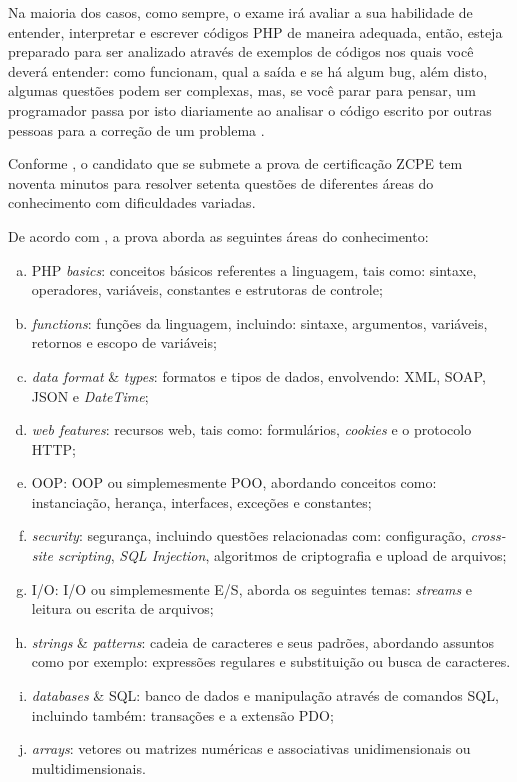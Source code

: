 Na maioria dos casos, como sempre, o exame irá avaliar a sua habilidade de
entender, interpretar e escrever códigos \acs{PHP} de maneira adequada, então,
esteja preparado para ser analizado através de exemplos de códigos nos quais
você deverá entender: como funcionam, qual a saída e se há algum \acs{bug},
além disto, algumas questões podem ser complexas, mas, se você parar para
pensar, um programador passa por isto diariamente ao analisar o código escrito
por outras pessoas para a correção de um problema
\cite{theZendPHPCertificationPracticeTestBook}.

Conforme , o candidato que
se submete a prova de certificação \acs{ZCPE} tem noventa minutos para resolver 
setenta questões de diferentes áreas do conhecimento com dificuldades variadas.

De acordo com , a prova aborda as seguintes áreas do
conhecimento:

\begin{enumerate}[a)]
    \item \acs{PHP} \textit{basics}: conceitos básicos referentes a
    linguagem, tais como: sintaxe, operadores, variáveis, constantes e
    estrutoras de controle;
    \item \textit{functions}: funções da linguagem, incluindo: sintaxe,
    argumentos, variáveis, retornos e escopo de variáveis;
    \item \textit{data format} \& \textit{types}: formatos e tipos de
    dados, envolvendo: \ac{XML}, \ac{SOAP}, \ac{JSON} e \textit{DateTime};
    \item \textit{web features}: recursos web, tais como: formulários,
    \textit{cookies} e o protocolo \ac{HTTP};
    \item \acs{OOP}: \acl{OOP} ou simplemesmente \ac{POO},
    abordando conceitos como: instanciação, herança, interfaces, exceções e
    constantes;
    \item \textit{security}: segurança, incluindo questões relacionadas com:
    configuração, \textit{cross-site scripting}, \textit{\acs{SQL} Injection},
    algoritmos de criptografia e upload de arquivos;
    \item \acs{I/O}: \acl{I/O} ou simplemesmente \ac{E/S}, aborda os seguintes
    temas: \textit{streams} e leitura ou escrita de arquivos;
    \item \textit{strings} \& \textit{patterns}: cadeia de caracteres e
    seus padrões, abordando assuntos como por exemplo: expressões
    regulares e substituição ou busca de caracteres.
    \item \textit{databases} \& \acs{SQL}: banco de dados e
    manipulação através de comandos \ac{SQL}, incluindo também: transações e a
    extensão \ac{PDO};
    \item \textit{arrays}: vetores ou matrizes numéricas e 
    associativas unidimensionais ou multidimensionais.
\end{enumerate}


